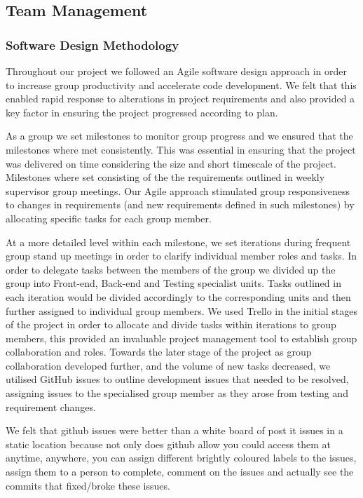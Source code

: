 \subsection{Team Management}
  \subsubsection{Software Design Methodology}
    Throughout our project we followed an Agile software design approach in order to increase group productivity and accelerate code development. We felt that this enabled rapid response to alterations in project requirements and also provided a key factor in ensuring the project progressed according to plan.

    As a group we set milestones to monitor group progress and we ensured that the milestones where met consistently. This was essential in ensuring that the project was delivered on time considering the size and short timescale of the project. Milestones where set consisting of the the requirements outlined in weekly supervisor group meetings. Our Agile approach stimulated group responsiveness to changes in requirements (and new requirements defined in such milestones) by allocating specific tasks for each group member. 

    At a more detailed level within each milestone, we set iterations during frequent group stand up meetings in order to clarify individual member roles and tasks. In order to delegate tasks between the members of the group we divided up the group into Front-end, Back-end and Testing specialist units. Tasks outlined in each iteration would be divided accordingly to the corresponding units and then further assigned to individual group members. We used Trello in the initial stages of the project in order to allocate and divide tasks within iterations to group members, this provided an invaluable project management tool to establish group collaboration and roles. Towards the later stage of the project as group collaboration developed further, and the volume of new tasks decreased, we utilised GitHub issues to outline development issues that needed to be resolved, assigning issues to the specialised group member as they arose from testing and requirement changes.

    We felt that github issues were better than a white board of post it issues in a static location because not only does github allow you could access them at anytime, anywhere, you can assign different brightly coloured labels to the issues, assign them to a person to complete, comment on the issues and actually see the commits that fixed/broke these issues. 


